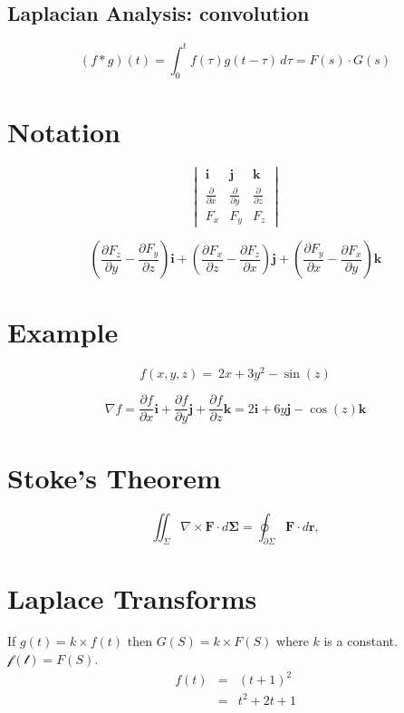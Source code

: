 \documentclass[12pt, a4paper]{article}
\begin{document}
\subsection*{Laplacian Analysis: convolution}

\[ (f * g)(t) = \int_0^t f(\tau)g(t-\tau)\,d\tau= F(s) \cdot G(s) \]


\section{Notation}
\[ \begin{vmatrix} \mathbf{i} & \mathbf{j} & \mathbf{k} \\
{\frac{\partial}{\partial x}} & {\frac{\partial}{\partial y}} & {\frac{\partial}{\partial z}} \\
 F_x & F_y & F_z \end{vmatrix}\]

\[\left(\frac{\partial F_z}{\partial y}  - \frac{\partial F_y}{\partial z}\right) \mathbf{i} + \left(\frac{\partial F_x}{\partial z} - \frac{\partial F_z}{\partial x}\right) \mathbf{j} + \left(\frac{\partial F_y}{\partial x} - \frac{\partial F_x}{\partial y}\right) \mathbf{k}\]

\section{Example}
\[f(x,y,z)= \ 2x+3y^2-\sin(z)\]

\[ \nabla f=
\frac{\partial f}{\partial x} \mathbf{i} +
\frac{\partial f}{\partial y} \mathbf{j} +
\frac{\partial f}{\partial z} \mathbf{k}
 = 2\mathbf{i}+ 6y\mathbf{j} -\cos(z)\mathbf{k}\]

\section{Stoke's Theorem}
\[
\iint_{\Sigma} \nabla \times \mathbf{F} \cdot d\mathbf{\Sigma} = \oint_{\partial\Sigma} \mathbf{F} \cdot d \mathbf{r}, \]

\section{Laplace Transforms }
If $g(t)=k \times f(t)$ then $G(S) = k \times F(S)$ where $k$ is a
constant. $\mathcal{f(t)}=F(S)$.
\begin{eqnarray}
f(t) &=& (t+1)^2\\
&=& t^2 +2t +1 \nonumber
\end{eqnarray}
\end{document}
